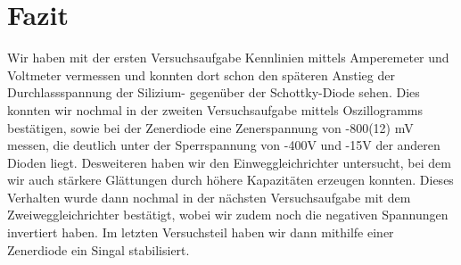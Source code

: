 \documentclass[a4paper,10pt]{article}
\numberwithin{equation}{section}
\begin{document}
\section{Fazit}
Wir haben mit der ersten Versuchsaufgabe Kennlinien mittels Amperemeter und Voltmeter vermessen und konnten dort schon den späteren Anstieg der Durchlassspannung der Silizium- gegenüber der Schottky-Diode sehen. Dies konnten wir nochmal in der zweiten Versuchsaufgabe mittels Oszillogramms bestätigen, sowie bei der Zenerdiode eine Zenerspannung von -800(12) mV messen, die deutlich unter der Sperrspannung von -400V und -15V der anderen Dioden liegt. Desweiteren haben wir den Einweggleichrichter untersucht, bei dem wir auch stärkere Glättungen durch höhere Kapazitäten erzeugen konnten. Dieses Verhalten wurde dann nochmal in der nächsten Versuchsaufgabe mit dem Zweiweggleichrichter bestätigt, wobei wir zudem noch die negativen Spannungen invertiert haben. Im letzten Versuchsteil haben wir dann mithilfe einer Zenerdiode ein Singal stabilisiert.
 
\clearpage
\listoffigures
\listoftables



\end{document}
